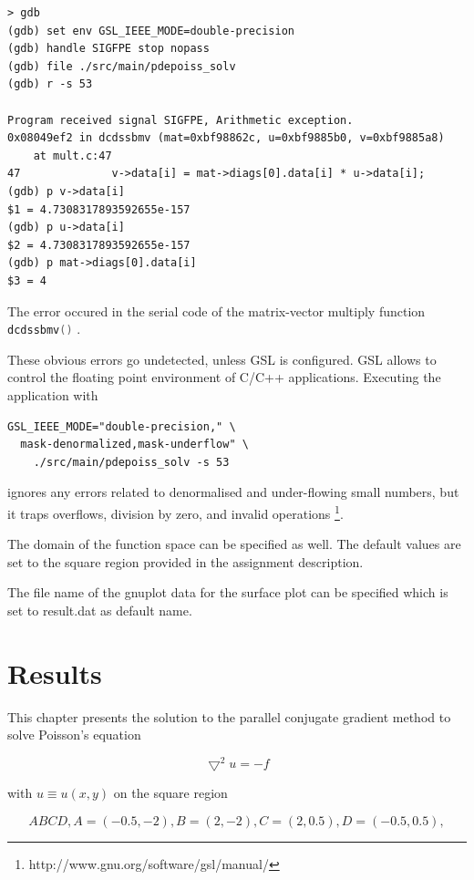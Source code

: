 \documentclass[12pt,a4paper]{report}
\def\ccode#1{
  \lstinline[basicstyle=\ttfamily,language=C]{#1} }
\begin{document}
\begin{verbatim}
> gdb
(gdb) set env GSL_IEEE_MODE=double-precision
(gdb) handle SIGFPE stop nopass
(gdb) file ./src/main/pdepoiss_solv
(gdb) r -s 53

Program received signal SIGFPE, Arithmetic exception.
0x08049ef2 in dcdssbmv (mat=0xbf98862c, u=0xbf9885b0, v=0xbf9885a8)
    at mult.c:47
47              v->data[i] = mat->diags[0].data[i] * u->data[i];
(gdb) p v->data[i]
$1 = 4.7308317893592655e-157
(gdb) p u->data[i]
$2 = 4.7308317893592655e-157
(gdb) p mat->diags[0].data[i]
$3 = 4
\end{verbatim}

The error occured in the serial code of the matrix-vector multiply
function \ccode{dcdssbmv()}.

These obvious errors go undetected, unless GSL is configured. GSL
allows to control the floating point environment of C/C++
applications. Executing the application with

\begin{verbatim}
GSL_IEEE_MODE="double-precision," \
  mask-denormalized,mask-underflow" \
    ./src/main/pdepoiss_solv -s 53
\end{verbatim}

ignores any errors related to denormalised and under-flowing small
numbers, but it traps overflows, division by zero, and invalid
operations \footnote{http://www.gnu.org/software/gsl/manual/}.

The domain of the function space can be specified as well. The default
values are set to the square region provided in the assignment
description.

The file name of the gnuplot data for the surface plot can be
specified which is set to result.dat as default name.

\chapter{Results}
\label{cha:results}

This chapter presents the solution to the parallel conjugate gradient
method to solve Poisson's equation

\begin{equation}
  \label{eq:poisson}
  \bigtriangledown^{2}u=-f
\end{equation}

with $u\equiv u(x,y)$ on the square region

\begin{equation}
  \label{eq:squareRegion}
  ABCD, A=(-0.5,-2), B=(2,-2), C=(2,0.5), D=(-0.5,0.5),
\end{equation}
\end{document}
